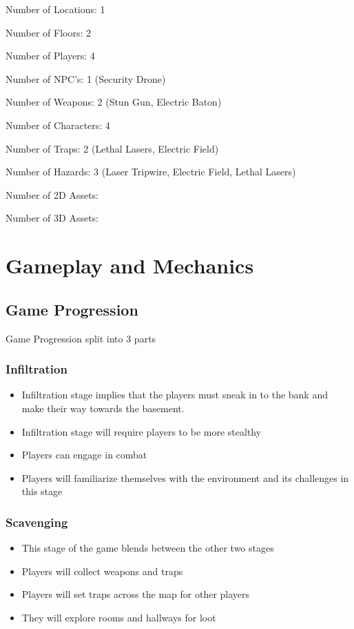 \documentclass[14pts]{report}
\begin{document}
Number of Locations: 1

Number of Floors: 2

Number of Players: 4

Number of NPC's: 1 (Security Drone)

Number of Weapons: 2 (Stun Gun, Electric Baton)

Number of Characters: 4

Number of Traps: 2 (Lethal Lasers, Electric Field)

Number of Hazards: 3 (Laser Tripwire, Electric Field, Lethal Lasers)

Number of 2D Assets: 

Number of 3D Assets: 


\chapter{Gameplay and Mechanics}

\section{Game Progression}
Game Progression split into 3 parts

\subsection{Infiltration}
\begin{itemize}
    \item Infiltration stage implies that the players must sneak in to the bank and make their way towards the basement.
    \item Infiltration stage will require players to be more stealthy
    \item Players can engage in combat
    \item Players will familiarize themselves with the environment and its challenges in this stage
\end{itemize}
\subsection{Scavenging}
\begin{itemize}
    \item This stage of the game blends between the other two stages
    \item Players will collect weapons and traps
    \item Players will set traps across the map for other players
    \item They will explore rooms and hallways for loot 
\end{itemize}
\end{document}
